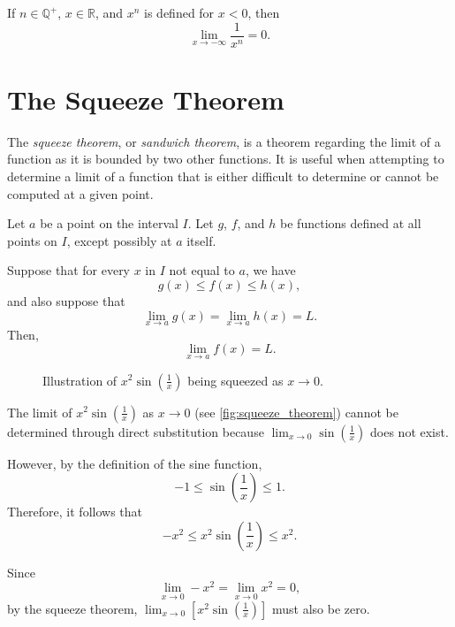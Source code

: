 \documentclass[headings=standardclasses]{scrreprt}
\begin{document}
\begin{nfact}
  If \(n ∈ ℚ^{+}\), \(x ∈ ℝ\), and \(x^{n}\) is defined for \(x < 0\), then
  \[ \lim_{x → -∞} \frac{1}{x^{n}} = 0. \]
\end{nfact}

\section{The Squeeze Theorem}

The \emph{squeeze theorem}, or \emph{sandwich theorem}, is a theorem regarding
the limit of a function as it is bounded by two other functions. It is useful
when attempting to determine a limit of a function that is either difficult to
determine or cannot be computed at a given point.

\begin{theorem}
  Let \(a\) be a point on the interval \(I\). Let \(g\), \(f\), and \(h\) be
  functions defined at all points on \(I\), except possibly at \(a\) itself.

  Suppose that for every \(x\) in \(I\) not equal to \(a\), we have
  \[ g(x) ≤ f(x) ≤ h(x), \] and also suppose that
  \[ \lim_{x → a } g(x) = \lim_{x → a} h(x) = L. \] Then,
  \[ \lim_{x → a} f(x) = L. \]
\end{theorem}

\begin{figure}[h]
  \centering


  \caption{Illustration of \(x^{2} \sin(\frac{1}{x})\) being squeezed as \(x → 0\).}\label{fig:squeeze_theorem}
\end{figure}

\begin{example}
  The limit of \(x^{2} \sin(\frac{1}{x})\) as \(x → 0\) (see
  \autoref{fig:squeeze_theorem}) cannot be determined through direct
  substitution because \(\lim_{x → 0} \sin(\frac{1}{x})\) does not exist.

  However, by the definition of the sine function,
  \[ -1 ≤ \sin(\frac{1}{x}) ≤ 1. \] Therefore, it follows that
  \[ -x^{2} ≤ x^{2} \sin(\frac{1}{x}) ≤ x^{2}. \]

  Since \[ \lim_{x → 0} -x^{2} = \lim_{x → 0} x^{2} = 0, \] by the squeeze
  theorem, \(\lim_{x → 0} [x^{2} \sin(\frac{1}{x})]\) must also be zero.
\end{example}
\end{document}
